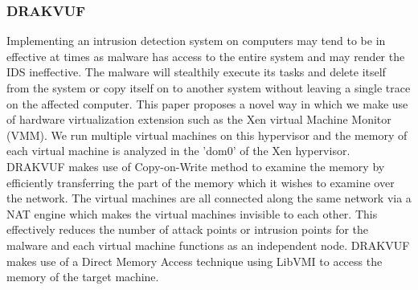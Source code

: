 \documentclass[11pt]{article}
\begin{document}
	\subsubsection{DRAKVUF}
	Implementing an intrusion detection system on computers may tend to be in effective at times as malware has access to the entire system and may render the IDS ineffective. The malware will stealthily execute its tasks and delete itself from the system or copy itself on to another system without leaving a single trace on the affected computer. This paper proposes a novel way in which we make use of hardware virtualization extension such as the Xen virtual Machine Monitor (VMM). We run multiple virtual machines on this hypervisor and the memory of each virtual machine is analyzed in the 'dom0' of the Xen hypervisor. DRAKVUF makes use of Copy-on-Write method to examine the memory by efficiently transferring the part of the memory which it wishes to examine over the network. The virtual machines are all connected along the same network via a NAT engine which makes the virtual machines invisible to each other. This effectively reduces the number of attack points or intrusion points for the malware and each virtual machine functions as an independent node. DRAKVUF makes use of a Direct Memory Access technique using LibVMI to access the memory of the target machine.
\end{document}
